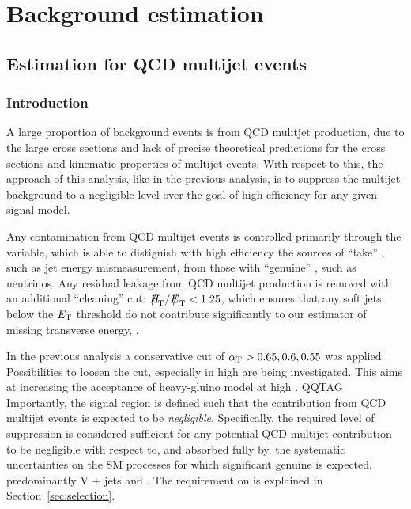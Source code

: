\section{Background estimation}
\label{sec:background}

\subsection{Estimation for QCD multijet events}
\subsubsection{Introduction}

A large proportion of background events is from QCD mulitjet production, due to the large cross sections and lack of precise theoretical
predictions for the cross sections and kinematic properties of multijet events. With respect to this, the approach of this analysis, like in the previous analysis, is to suppress the multijet background to a negligible level over the goal of high efficiency for any given signal model.
 
Any contamination from QCD multijet events is controlled primarily through the \alphat variable, which is able to distiguish with high efficiency the sources of ``fake'' \met, such as jet energy mismeasurement, from those with ``genuine'' \met, such as neutrinos. Any residual leakage from QCD multijet production is removed with an additional ``\met cleaning'' cut: $\mhtmet < 1.25$, which ensures that any soft jets below the ${E_{\text T}}$ threshold do not contribute significantly to our estimator of missing transverse energy, \mht.

In the previous analysis a conservative cut of $\alpha_{\text{T}} > 0.65,0.6,0.55$ was applied. Possibilities to loosen the \alphat cut, especially in high \scalht are being investigated. This aims at increasing the acceptance of heavy-gluino model at high \scalht. QQTAG Importantly, the signal region is defined such that the contribution from QCD multijet events is expected to be {\it negligible}. Specifically, the required level of suppression is considered sufficient for any potential QCD multijet contribution to be negligible with respect to, and absorbed fully by, the systematic uncertainties on the SM processes for which significant genuine \met is expected, predominantly V + jets and \ttbar. The requirement on \alphat is explained in Section~\ref{sec:selection}.

